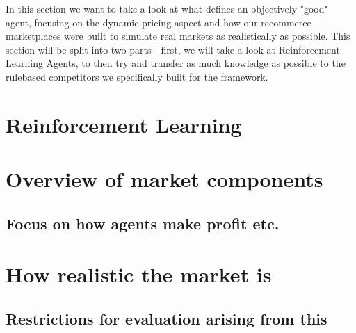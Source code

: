 \begin{jointwork}
	In this section we want to take a look at what defines an objectively "good" agent, focusing on the dynamic pricing aspect and how our recommerce marketplaces
	were built to simulate real markets as realistically as possible. This section will be split into two parts - first, we will take a look at Reinforcement Learning Agents,
	to then try and transfer as much knowledge as possible to the rulebased competitors we specifically built for the framework.
\end{jointwork}

\section{Reinforcement Learning}



\section{Overview of market components}
\subsection{Focus on how agents make profit etc.}
\section{How realistic the market is}
\subsection{Restrictions for evaluation arising from this}